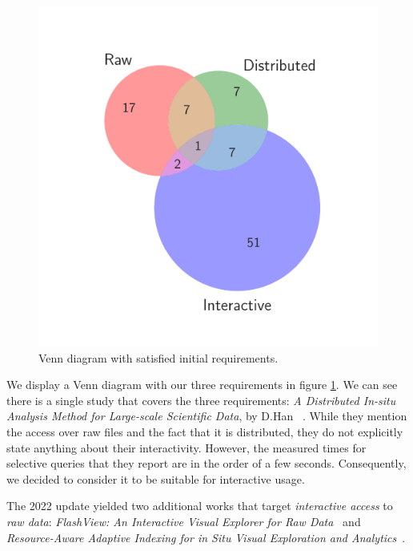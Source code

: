 \begin{figure}[htbp]
    \centering
    \includegraphics{images/3_mapping/venn}
    \caption{Venn diagram with satisfied initial requirements.}
    \label{fig:mapping/venn_requirements}
\end{figure}

We display a Venn diagram with our three requirements in figure \ref{fig:mapping/venn_requirements}. We can see there is a single study that covers the three requirements:
\textit{{A} {D}istributed {I}n-situ {A}nalysis {M}ethod for {L}arge-scale
{S}cientific {D}ata}, by D.Han \etal~\cite{Han2017}. While they mention the
access over raw files and the fact that it is distributed, they do not
explicitly state anything about their interactivity. However, the measured times
for selective queries that they report are in the order of a few seconds. Consequently, we
decided to consider it to be suitable for interactive usage.

The 2022 update yielded two additional works that target \emph{interactive access}
to \emph{raw data}: \textit{{FlashView}: {A}n {I}nteractive {V}isual {E}xplorer
for {R}aw {D}ata}~\cite{10.14778/3137765.3137796} and
\textit{{R}esource-{A}ware {A}daptive {I}ndexing for in {S}itu {V}isual {E}xploration
and {A}nalytics}~\cite{maroulis_resource-aware_2023}.


